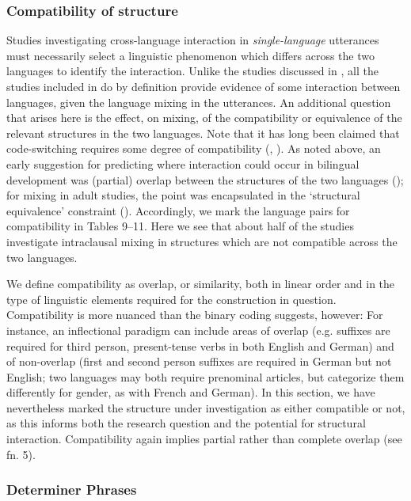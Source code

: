 \documentclass[output=paper]{langscibook}
\begin{document}
\subsubsection{Compatibility of structure} 

Studies investigating cross-language interaction in \textit{single-language} utterances must necessarily select a linguistic phenomenon which differs across the two languages to identify the interaction. Unlike the studies discussed in , all the studies included in  do by definition provide evidence of some interaction between languages, given the language mixing in the utterances. An additional question that arises here is the effect, on mixing, of the compatibility or equivalence of the relevant structures in the two languages. Note that it has long been claimed that code-switching requires some degree of compatibility (\citealt{Poplack1980}, \citealt{Myers-Scotton1993duelling}). As noted above, an early suggestion for predicting where interaction could occur in bilingual development was (partial) overlap between the structures of the two languages (\citealt{HulkMüller2000}); for mixing in adult studies, the point was encapsulated in the ‘structural equivalence’ constraint (\citealt{Poplack1980}). Accordingly, we mark the language pairs for compatibility in Tables 9–11. Here we see that about half of the studies investigate intraclausal mixing in structures which are not compatible across the two languages.

We define compatibility as overlap, or similarity, both in linear order and in the type of linguistic elements required for the construction in question. Compatibility is more nuanced than the binary coding suggests, however: For instance, an inflectional paradigm can include areas of overlap (e.g. suffixes are required for third person, present-tense verbs in both English and German) and of non-overlap (first and second person suffixes are required in German but not English; two languages may both require prenominal articles, but categorize them differently for gender, as with French and German). In this section, we have nevertheless marked the structure under investigation as either compatible or not, as this informs both the research question and the potential for structural interaction. Compatibility again implies partial rather than complete overlap (see fn. 5).

\subsubsection{Determiner Phrases}
\end{document}
